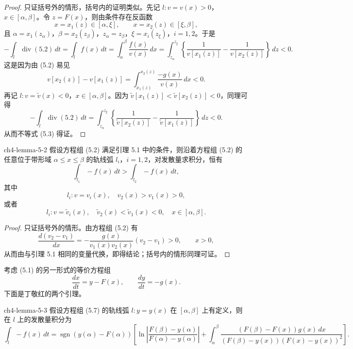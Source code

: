 \begin{proof}
只证括号外的情形，括号内的证明类似。先记 $l:v=v(x)>0$，$x\in[\alpha,\beta]$。令 $z=F(x)$，则由条件存在反函数
\[
x=x_1(z)\in[\alpha,\xi],\qquad x=x_2(z)\in[\xi,\beta],
\]
且 $\alpha=x_1(z_\alpha)$，$\beta=x_2(z_\beta)$，$z_\alpha=z_\beta$，$\xi=x_i(z_\xi)$，$i=1,2$。于是
\[
-\int_l\operatorname{div}(5.2)\,dt
=\int_lf(x)\,dt
=\int_\alpha^\beta\dfrac{f(x)}{v(x)}\,dx
=\int_{z_\alpha}^{z_\xi}\left\{\dfrac1{v[x_1(z)]}-\dfrac1{v[x_2(z)]}\right\}\,dz<0.
\]
这是因为由 (5.2) 易见
\[
v[x_2(z)]-v[x_1(z)]=\int_{x_1(z)}^{x_2(z)}\dfrac{-g(x)}{v(x)}\,dx<0.
\]
再记 $l:v=\widetilde v(x)<0$，$x\in[\alpha,\beta]$。因为 $\widetilde v[x_1(z)]<\widetilde v[x_2(z)]<0$，同理可得
\[
-\int_l\operatorname{div}(5.2)\,dt
=\int_{z_\alpha}^{z_\xi}\left\{\dfrac1{\widetilde v[x_2(z)]}-\dfrac1{\widetilde v[x_1(z)]}\right\}\,dz<0.
\]
从而不等式 (5.3) 得证。
\end{proof}

\begin{lemma}{ }{ch4-lemma-5-2}
假设方程组 (5.2) 满足引理 5.1 中的条件，则沿着方程组 (5.2) 的任意位于带形域 $\alpha\leqslant x\leqslant\beta$ 的轨线弧 $l_i$，$i=1,2$，对发散量求积分，恒有
\begin{equation}
\int_{l_1}-f(x)\,dt>\int_{l_2}-f(x)\,dt,\tag{5.4}
\end{equation}
其中
\[
l_i:v=v_i(x),\quad v_2(x)>v_1(x)>0,
\]
或者
\[
l_i:v=\widetilde v_i(x),\quad \widetilde v_2(x)<\widetilde v_1(x)<0,\quad x\in[\alpha,\beta].\tag{5.5--5.6}
\]
\end{lemma}

\begin{proof}
只证括号外的情形。由方程组 (5.2) 有
\[
\dfrac{d(v_2-v_1)}{dx}=-\dfrac{g(x)}{v_1(x)v_2(x)}(v_2-v_1)>0,\qquad x>0,
\]
从而由与引理 5.1 相同的变量代换，即得结论；括号内的情形同理可证。
\end{proof}

考虑 (5.1) 的另一形式的等价方程组
\begin{equation}
\dfrac{dx}{dt}=y-F(x),\qquad \dfrac{dy}{dt}=-g(x).\tag{5.7}
\end{equation}
下面是丁敬红的两个引理。

\begin{lemma}{ }{ch4-lemma-5-3}
假设方程组 (5.7) 的轨线弧 $l:y=y(x)$ 在 $[\alpha,\beta]$ 上有定义，则在 $l$ 上的发散量积分为
\begin{equation}
\int_l-f(x)\,dt=\operatorname{sgn}(y(\alpha)-F(\alpha))\left[\ln\left|\dfrac{F(\beta)-y(\alpha)}{F(\alpha)-y(\alpha)}\right|+\int_\alpha^\beta\dfrac{(F(\beta)-F(x))g(x)\,dx}{(F(\beta)-y(x))(F(x)-y(x))^2}\right].\tag{5.8}
\end{equation}
\end{lemma}

